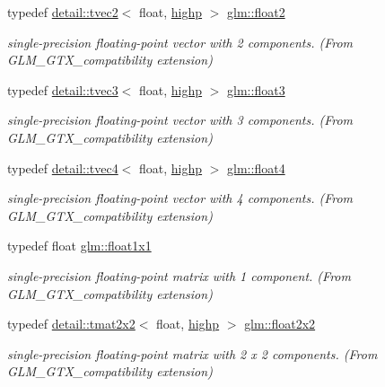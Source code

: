 \begin{DoxyCompactItemize}
typedef \hyperlink{structglm_1_1detail_1_1tvec2}{detail\+::tvec2}$<$ float, \hyperlink{namespaceglm_a0f04f086094c747d227af4425893f545ac6f7eab42eacbb10d59a58e95e362074}{highp} $>$ \hyperlink{group__gtx__compatibility_ga6ab0b791bbb15ef51a0e930a8710e6b1}{glm\+::float2}
\begin{DoxyCompactList}\small\item\em single-\/precision floating-\/point vector with 2 components. (From G\+L\+M\+\_\+\+G\+T\+X\+\_\+compatibility extension) \end{DoxyCompactList}\item 
typedef \hyperlink{structglm_1_1detail_1_1tvec3}{detail\+::tvec3}$<$ float, \hyperlink{namespaceglm_a0f04f086094c747d227af4425893f545ac6f7eab42eacbb10d59a58e95e362074}{highp} $>$ \hyperlink{group__gtx__compatibility_ga7e0d8fa3501c0a7eaaca31adb6e02de2}{glm\+::float3}
\begin{DoxyCompactList}\small\item\em single-\/precision floating-\/point vector with 3 components. (From G\+L\+M\+\_\+\+G\+T\+X\+\_\+compatibility extension) \end{DoxyCompactList}\item 
typedef \hyperlink{structglm_1_1detail_1_1tvec4}{detail\+::tvec4}$<$ float, \hyperlink{namespaceglm_a0f04f086094c747d227af4425893f545ac6f7eab42eacbb10d59a58e95e362074}{highp} $>$ \hyperlink{group__gtx__compatibility_gac0676d140051809309ca683c325bf439}{glm\+::float4}
\begin{DoxyCompactList}\small\item\em single-\/precision floating-\/point vector with 4 components. (From G\+L\+M\+\_\+\+G\+T\+X\+\_\+compatibility extension) \end{DoxyCompactList}\item 
typedef float \hyperlink{group__gtx__compatibility_gaac1faa940ac1fbb32d4a315005b578af}{glm\+::float1x1}
\begin{DoxyCompactList}\small\item\em single-\/precision floating-\/point matrix with 1 component. (From G\+L\+M\+\_\+\+G\+T\+X\+\_\+compatibility extension) \end{DoxyCompactList}\item 
typedef \hyperlink{structglm_1_1detail_1_1tmat2x2}{detail\+::tmat2x2}$<$ float, \hyperlink{namespaceglm_a0f04f086094c747d227af4425893f545ac6f7eab42eacbb10d59a58e95e362074}{highp} $>$ \hyperlink{group__gtx__compatibility_gaa4a1e4449913b2437f12434ed713dd73}{glm\+::float2x2}
\begin{DoxyCompactList}\small\item\em single-\/precision floating-\/point matrix with 2 x 2 components. (From G\+L\+M\+\_\+\+G\+T\+X\+\_\+compatibility extension) \end{DoxyCompactList}\item 

\end{DoxyCompactItemize}
